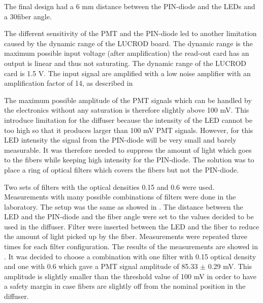 The final design had a 6 mm distance between the PIN-diode and the LEDs and a 30\degree fiber angle.

The different sensitivity of the PMT and the PIN-diode led to another limitation caused by the dynamic range of the LUCROD board.
The dynamic range is the maximum possible input voltage (after amplification) the read-out card has an output is linear and thus not saturating.
The dynamic range of the LUCROD card is 1.5 V. 
The input signal are amplified with a low noise amplifier with an amplification factor of 14, as described in  

The maximum possible amplitude of the PMT signals which can be handled by the electronics without any saturation is therefore slightly above 100 mV.
This introduce limitation for the diffuser because the intensity of the LED cannot be too high so that it produces larger than 100 mV PMT signals.
However, for this LED intensity the signal from the PIN-diode will be very small and barely measurable.
It was therefore needed to suppress the amount of light which goes to the fibers while keeping high intensity for the PIN-diode.
The solution was to place a ring of optical filters which covers the fibers but not the PIN-diode.

Two sets of filters with the optical densities 0.15 and 0.6 were used. 
Measurements with many possible combinations of filters were done in the laboratory.
The setup was the same as showed in . The distance between the LED and the PIN-diode 
and the fiber angle were set to the values 
decided to be used in the diffuser. 
Filter were inserted between the LED and the fiber to reduce the amount of light picked up by the fiber.
Measurements were repeated three times for each filter configuration. The results of the measurements are showed in .
It was decided to choose a combination with one filter with 0.15 optical density and one with 0.6 which gave a PMT signal amplitude of 85.33 $\pm$ 0.29 mV.
This amplitude is slightly smaller than the threshold value of 100 mV in order to have a safety margin in case fibers 
are slightly off from the nominal position in the diffuser.



